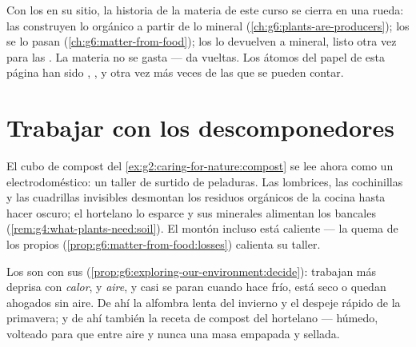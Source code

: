 \begin{remark}\label{rem:g6:decomposers-and-soil:circle}
Con los  en su sitio, la historia de la materia de este
curso se cierra en una rueda: las  construyen lo orgánico a
partir de lo mineral (\cref{ch:g6:plants-are-producers}); los
 se lo pasan (\cref{ch:g6:matter-from-food}); los
 lo devuelven a mineral, listo otra vez para las
. La materia no se gasta --- da vueltas. Los átomos del
papel de esta página han sido , ,  y otra vez  más
veces de las que se pueden contar.
\end{remark}

\section{Trabajar con los descomponedores}

\begin{example}\label{ex:g6:decomposers-and-soil:compost}
El cubo de compost del \cref{ex:g2:caring-for-nature:compost} se lee
ahora como un electrodoméstico: un taller de  surtido de
peladuras. Las lombrices, las cochinillas y las cuadrillas invisibles
desmontan los residuos orgánicos de la cocina hasta hacer  oscuro;
el hortelano lo esparce y sus minerales alimentan los bancales
(\cref{rem:g4:what-plants-need:soil}). El montón incluso está caliente
--- la quema de los propios 
(\cref{prop:g6:matter-from-food:losses}) calienta su taller.
\end{example}

\begin{proposition}\label{prop:g6:decomposers-and-soil:speed}
Los  son  con sus 
(\cref{prop:g6:exploring-our-environment:decide}): trabajan más deprisa
con \emph{calor}, \emph{} y \emph{aire}, y casi se paran cuando
hace frío, está seco o quedan ahogados sin aire. De ahí la alfombra
lenta del invierno y el despeje rápido de la primavera; y de ahí también
la receta de compost del hortelano --- húmedo, volteado para que entre
aire y nunca una masa empapada y sellada.
\end{proposition}
\admitted


